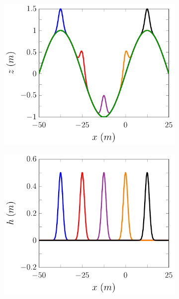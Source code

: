 \begin{figure}
	\centering
	\begin{subfigure}{0.5\textwidth}
		\includegraphics[width=\textwidth]{./chp5/figures/Forced/Dry/P2P/FDVMExw.pdf}
		\vspace{0.5cm}
	\end{subfigure}%
	\begin{subfigure}{0.5\textwidth}
		\includegraphics[width=\textwidth]{./chp5/figures/Forced/Dry/P2P/FDVMExh.pdf}
		\vspace{0.5cm}

\end{subfigure}
\end{figure}
